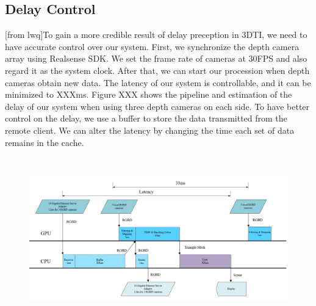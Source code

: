 \subsection{Delay Control}
[from lwq]To gain a more credible result of delay preception in 3DTI, we need to have accurate control over our system. First, we synchronize the depth camera array using Realsense SDK. We set the frame rate of cameras at 30FPS and also regard it as the system clock. After that, we can start our procession when depth cameras obtain new data. The latency of our system is controllable, and it can be minimized to XXXms. Figure XXX shows the pipeline and estimation of the delay of our system when using three depth cameras on each side. To have better control on the delay, we use a buffer to store the data transmitted from the remote client. We can alter the latency by changing the time each set of data remains in the cache.

\begin{figure}[!htbp]
\centering
\includegraphics[width=14cm,height=7cm]{figures/figure_pipeline.png}
\setlength{\abovecaptionskip}{0.5cm}
\caption{}
\label{5}
\end{figure}
